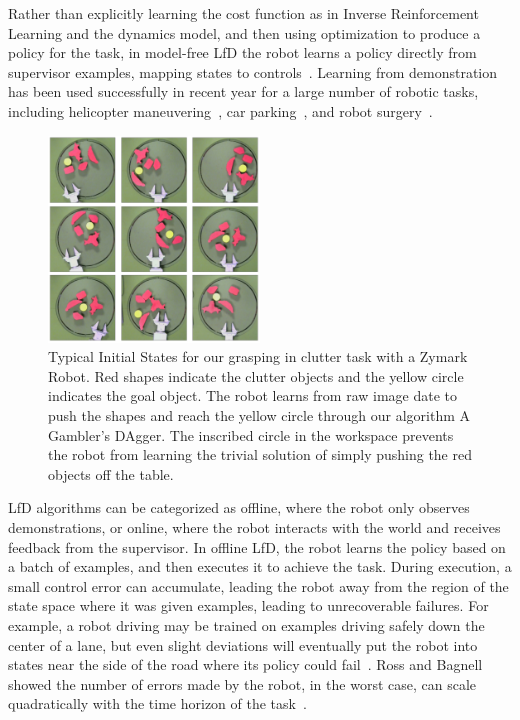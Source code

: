 \documentclass[10pt, conference]{ieeeconf}      %
\begin{document}
Rather than explicitly learning the cost function as in Inverse Reinforcement Learning and the dynamics model, and then using optimization to produce a policy for the task, in model-free LfD the robot learns a policy directly from supervisor examples, mapping states to controls~\cite{argall2009survey}. Learning from demonstration has been used successfully in recent year for a large number of robotic tasks, including helicopter maneuvering~\cite{abbeel2007application}, car parking~\cite{abbeel2008apprenticeship},  and robot surgery~\cite{van2010superhuman}. 

 \begin{figure}
\includegraphics[width=0.5\textwidth]{f_figs/teaser.pdf}
\caption{Typical Initial States for our grasping in clutter task with a Zymark Robot. Red shapes indicate the clutter objects and the yellow circle indicates the goal object. The robot learns from raw image date to push the shapes and reach the yellow circle through our algorithm A Gambler's DAgger. The inscribed circle in the workspace prevents the robot from learning the trivial solution of simply pushing the red objects off the table.}
\vspace*{-20pt}
\label{fig:teaser}
\end{figure}


LfD algorithms can be categorized as offline, where the robot only observes demonstrations, or online, where the robot interacts with the world and receives feedback from the supervisor.
In offline LfD, the robot learns the policy based on a batch of examples, and then executes it to achieve the task.  During execution, a small control error can accumulate, leading the robot away from the region of the state space where it was given examples, leading to unrecoverable failures.  For example, a robot driving may be trained on examples driving safely down the center of a lane, but even slight deviations will eventually put the robot into states near the side of the road where its policy could  fail~\cite{pomerleau1989alvinn}. Ross and Bagnell showed the number of errors made by the robot, in the worst case,  can scale quadratically with the time horizon of the task~\cite{ross2010efficient}.
\end{document}
